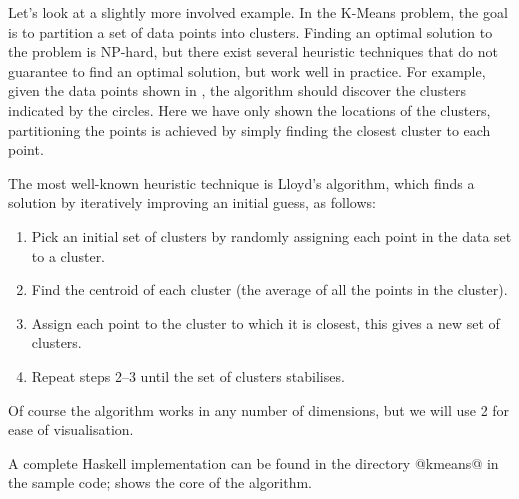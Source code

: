 Let's look at a slightly more involved example.  In the K-Means
problem, the goal is to partition a set of data points into clusters.
Finding an optimal solution to the problem is NP-hard, but there exist
several heuristic techniques that do not guarantee to find an optimal
solution, but work well in practice.  For example, given the data
points shown in , the algorithm should discover
the clusters indicated by the circles.  Here we have only shown the
locations of the clusters, partitioning the points is achieved by
simply finding the closest cluster to each point.

The most well-known heuristic technique is Lloyd's algorithm, which
finds a solution by iteratively improving an initial guess, as
follows:

\begin{enumerate}
\item Pick an initial set of clusters by randomly assigning each point
  in the data set to a cluster.
\item Find the centroid of each cluster (the average of all the points
  in the cluster).
\item Assign each point to the cluster to which it is closest, this
  gives a new set of clusters.
\item Repeat steps 2--3 until the set of clusters stabilises.
\end{enumerate}

Of course the algorithm works in any number of dimensions, but we will
use 2 for ease of visualisation.

A complete Haskell implementation can be found in the directory
@kmeans@ in the sample code;  shows the core of
the algorithm.

